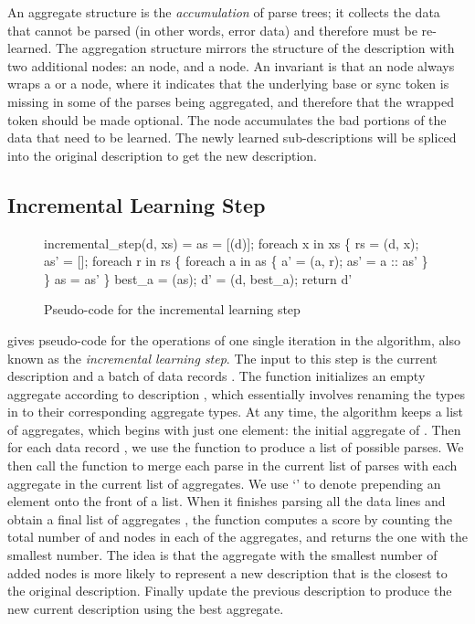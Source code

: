 An aggregate structure is the {\em accumulation} of parse trees; it
collects the data that cannot be parsed (in other words, error data)
and therefore must be re-learned.
The aggregation structure mirrors the structure of the description  
with two additional nodes: an  node, and a  node. 
An invariant is that an  node always wraps a  or a  node,
where it indicates that the underlying base or sync token is missing
in some of the parses being aggregated, and therefore that the wrapped
token should be made optional. 
The  node accumulates the bad portions of the data that need
to be learned. The newly learned sub-descriptions 
will be spliced into the original description to get the new description. 

\subsection{Incremental Learning Step}
\begin{figure}[t]
\begin{codebox}
incremental_step(d, xs) =
  as = [(d)];
  foreach x in xs \{
    rs = (d, x);
    as' = [];
    foreach r in rs \{
      foreach a in as \{
        a' = (a, r); 
        as' = a :: as'
      \}
    \}
    as = as'
  \} 
  best_a = (as);
  d' = (d, best_a);  
  return d'
\end{codebox}
\caption{Pseudo-code for the incremental learning step}
\label{fig:inc-learning}
\end{figure}

 gives pseudo-code for the operations of one
single iteration in the algorithm, also known as the {\em incremental
learning step}.
The input to this step is the current description  and a batch of
data records .
The  function initializes an empty aggregate
according to description , which essentially involves renaming
the types in  to their corresponding aggregate types.
At any time, the algorithm keeps a list of aggregates,
which begins with just one element: the initial aggregate of .
Then for each data record , we use the  function to
produce a list  of possible parses.
We then call the  function to merge
each parse  in the current list of parses with 
each aggregate  in the
current list of aggregates. 
We use `\cd{::}' to denote 
prepending an element onto the front of a list. 
When it finishes parsing all the data lines and obtain 
a final list of aggregates , 
the  function computes a score by counting the total 
number of  and  nodes
in each of the aggregates, and returns the one with the smallest number. 
The idea is that the aggregate with the smallest number of added nodes is 
more likely to represent a new description
that is the closest to the original description. 
Finally  update the previous description
 to produce the new current description  
using the best aggregate. 

